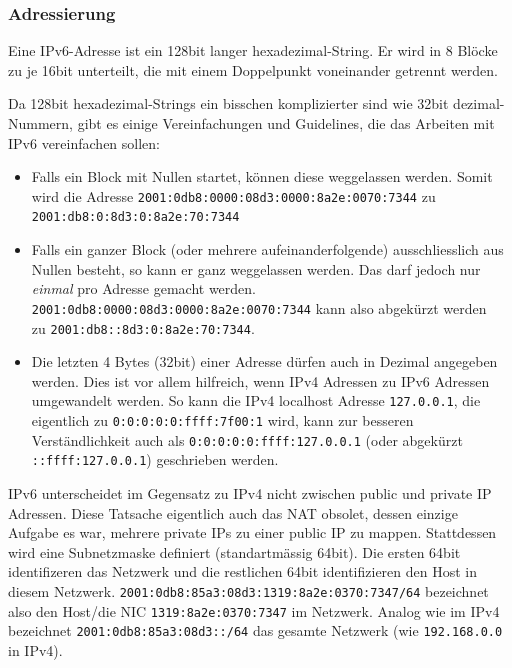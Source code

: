 \documentclass[a4paper, 11pt]{article}
\newcommand{\code}[1]{\texttt{#1}}
\begin{document}
\subsubsection{Adressierung}
Eine IPv6-Adresse ist ein 128bit langer hexadezimal-String. Er wird in 8 Blöcke zu je 16bit unterteilt, die mit einem Doppelpunkt voneinander getrennt werden.

Da 128bit hexadezimal-Strings ein bisschen komplizierter sind wie 32bit dezimal-Nummern, gibt es einige Vereinfachungen und Guidelines, die das Arbeiten mit IPv6 vereinfachen sollen:

\begin{itemize}
	\item Falls ein Block mit Nullen startet, können diese weggelassen werden. Somit wird die Adresse \code{2001:0db8:0000:08d3:0000:8a2e:0070:7344} zu \code{2001:db8:0:8d3:0:8a2e:70:7344}
	\item Falls ein ganzer Block (oder mehrere aufeinanderfolgende) ausschliesslich aus Nullen besteht, so kann er ganz weggelassen werden. Das darf jedoch nur \textit{einmal} pro Adresse gemacht werden. \code{2001:0db8:0000:08d3:0000:8a2e:0070:7344} kann also abgekürzt werden \\
	zu \code{2001:db8::8d3:0:8a2e:70:7344}.
	\item Die letzten 4 Bytes (32bit) einer Adresse dürfen auch in Dezimal angegeben werden. Dies ist vor allem hilfreich, wenn IPv4 Adressen zu IPv6 Adressen umgewandelt werden. So kann die IPv4 localhost Adresse \code{127.0.0.1}, die eigentlich zu \code{0:0:0:0:0:ffff:7f00:1} wird, kann zur besseren Verständlichkeit auch als \code{0:0:0:0:0:ffff:127.0.0.1} (oder abgekürzt \code{::ffff:127.0.0.1}) geschrieben werden.
\end{itemize}

IPv6 unterscheidet im Gegensatz zu IPv4 nicht zwischen public und private IP Adressen. Diese Tatsache eigentlich auch das NAT obsolet, dessen einzige Aufgabe es war, mehrere private IPs zu einer public IP zu mappen. Stattdessen wird eine Subnetzmaske definiert (standartmässig 64bit). Die ersten 64bit identifizeren das Netzwerk und die restlichen 64bit identifizieren den Host in diesem Netzwerk. \code{2001:0db8:85a3:08d3:1319:8a2e:0370:7347/64} bezeichnet also den Host/die NIC \code{1319:8a2e:0370:7347} im Netzwerk. Analog wie im IPv4 bezeichnet \code{2001:0db8:85a3:08d3::/64} das gesamte Netzwerk (wie \code{192.168.0.0} in IPv4). 

\vspace{10px}
\end{document}

